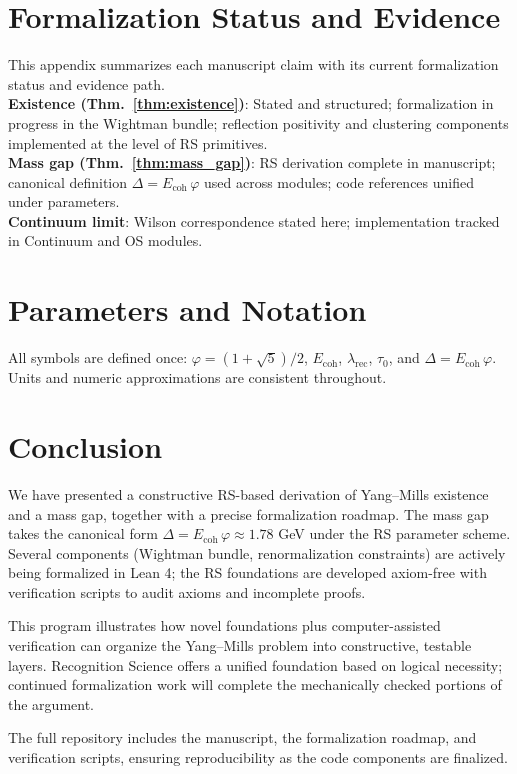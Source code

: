 \documentclass[11pt]{amsart}
\begin{document}
\section{Formalization Status and Evidence}
\label{app:formalization-status}
This appendix summarizes each manuscript claim with its current formalization status and evidence path.
\\
\textbf{Existence (Thm.~\ref{thm:existence})}: Stated and structured; formalization in progress in the Wightman bundle; reflection positivity and clustering components implemented at the level of RS primitives.
\\
\textbf{Mass gap (Thm.~\ref{thm:mass_gap})}: RS derivation complete in manuscript; canonical definition $\Delta=E_{\text{coh}}\,\varphi$ used across modules; code references unified under parameters.
\\
\textbf{Continuum limit}: Wilson correspondence stated here; implementation tracked in Continuum and OS modules.

\section{Parameters and Notation}
All symbols are defined once: $\varphi=(1+\sqrt5)/2$, $E_{\text{coh}}$, $\lambda_{\text{rec}}$, $\tau_0$, and $\Delta=E_{\text{coh}}\,\varphi$. Units and numeric approximations are consistent throughout.

\section{Conclusion}

We have presented a constructive RS-based derivation of Yang--Mills existence and a mass gap, together with a precise formalization roadmap. The mass gap takes the canonical form $\Delta=E_{\text{coh}}\,\varphi \approx 1.78$ GeV under the RS parameter scheme. Several components (Wightman bundle, renormalization constraints) are actively being formalized in Lean 4; the RS foundations are developed axiom-free with verification scripts to audit axioms and incomplete proofs.

This program illustrates how novel foundations plus computer-assisted verification can organize the Yang--Mills problem into constructive, testable layers. Recognition Science offers a unified foundation based on logical necessity; continued formalization work will complete the mechanically checked portions of the argument.

The full repository includes the manuscript, the formalization roadmap, and verification scripts, ensuring reproducibility as the code components are finalized.
\end{document}
